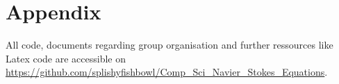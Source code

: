 \documentclass[12pt,twoside=off,
bibtotoc,liststotoc,appendixprefix,paper=a4,headings=small]{scrbook} %
\begin{document}
%
\frontmatter 
    \newpage
    \clearpage{\pagestyle{empty}\cleardoublepage}
    
    \newpage
    
    \clearpage{\pagestyle{empty}\cleardoublepage}
    \onehalfspacing                  	%
    \tableofcontents 					%
    \clearpage{\pagestyle{empty}\cleardoublepage} 
    
    \listoffigures 					 	%
    \clearpage{\pagestyle{empty}\cleardoublepage}
    
    \listoftables						%
    \clearpage{\pagestyle{empty}\cleardoublepage}

\mainmatter 							%

    
    \clearpage{\pagestyle{empty}\cleardoublepage}		%
    
    \clearpage{\pagestyle{empty}\cleardoublepage}
    
    \clearpage{\pagestyle{empty}\cleardoublepage}
    
    \clearpage{\pagestyle{empty}\cleardoublepage}

\backmatter 

\newpage
\chapter{Appendix}
All code, documents regarding group organisation and further ressources like Latex code are accessible on \url{https://github.com/splishyfishbowl/Comp_Sci_Navier_Stokes_Equations}.
\end{document}
